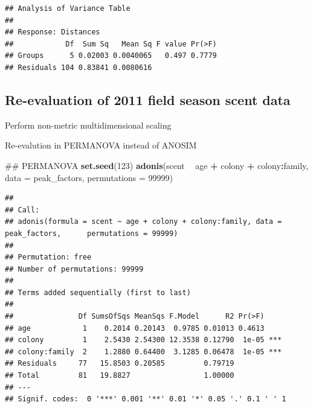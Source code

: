 \documentclass[]{article}
\newenvironment{Shaded}{\begin{snugshade}}{\end{snugshade}}
\newcommand{\KeywordTok}[1]{\textcolor[rgb]{0.13,0.29,0.53}{\textbf{#1}}}
\newcommand{\DataTypeTok}[1]{\textcolor[rgb]{0.13,0.29,0.53}{#1}}
\newcommand{\DecValTok}[1]{\textcolor[rgb]{0.00,0.00,0.81}{#1}}
\newcommand{\StringTok}[1]{\textcolor[rgb]{0.31,0.60,0.02}{#1}}
\newcommand{\CommentTok}[1]{\textcolor[rgb]{0.56,0.35,0.01}{\textit{#1}}}
\newcommand{\OperatorTok}[1]{\textcolor[rgb]{0.81,0.36,0.00}{\textbf{#1}}}
\newcommand{\NormalTok}[1]{#1}
\begin{document}
\begin{verbatim}
## Analysis of Variance Table
## 
## Response: Distances
##            Df  Sum Sq   Mean Sq F value Pr(>F)
## Groups      5 0.02003 0.0040065   0.497 0.7779
## Residuals 104 0.83841 0.0080616
\end{verbatim}

\subsection{Re-evaluation of 2011 field season scent
data}\label{re-evaluation-of-2011-field-season-scent-data}

Perform non-metric multidimensional scaling

Re-evalution in PERMANOVA instead of ANOSIM

\begin{Shaded}
\begin{Highlighting}[]
\NormalTok{## PERMANOVA}
\KeywordTok{set.seed}\NormalTok{(}\DecValTok{123}\NormalTok{)}
\KeywordTok{adonis}\NormalTok{(scent }\OperatorTok{~}\StringTok{ }\NormalTok{age }\OperatorTok{+}\StringTok{ }\NormalTok{colony }\OperatorTok{+}\StringTok{ }\NormalTok{colony}\OperatorTok{:}\NormalTok{family, }
    \DataTypeTok{data =}\NormalTok{ peak_factors, }\DataTypeTok{permutations =} \DecValTok{99999}\NormalTok{)}
\end{Highlighting}
\end{Shaded}

\begin{verbatim}
## 
## Call:
## adonis(formula = scent ~ age + colony + colony:family, data = peak_factors,      permutations = 99999) 
## 
## Permutation: free
## Number of permutations: 99999
## 
## Terms added sequentially (first to last)
## 
##               Df SumsOfSqs MeanSqs F.Model      R2 Pr(>F)    
## age            1    0.2014 0.20143  0.9785 0.01013 0.4613    
## colony         1    2.5430 2.54300 12.3538 0.12790  1e-05 ***
## colony:family  2    1.2880 0.64400  3.1285 0.06478  1e-05 ***
## Residuals     77   15.8503 0.20585         0.79719           
## Total         81   19.8827                 1.00000           
## ---
## Signif. codes:  0 '***' 0.001 '**' 0.01 '*' 0.05 '.' 0.1 ' ' 1
\end{verbatim}

\begin{Shaded}
\end{Shaded}
\end{document}
